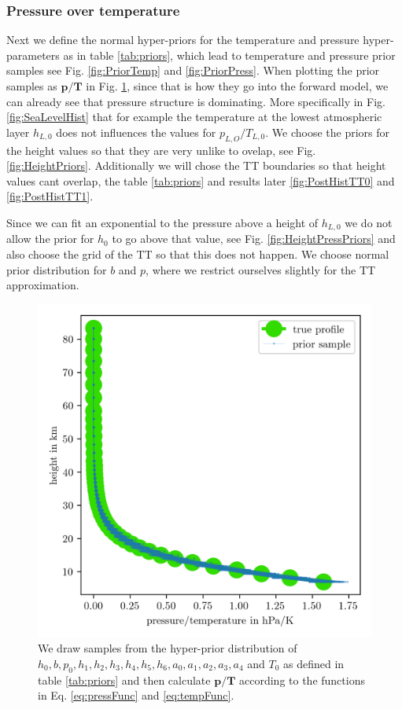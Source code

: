 \subsubsection{Pressure over temperature}
Next we define the normal hyper-priors for the temperature and pressure hyper-parameters as in table \ref{tab:priors}, which lead to temperature and pressure prior samples see Fig. \ref{fig:PriorTemp} and \ref{fig:PriorPress}.
When plotting the prior samples as $\bm{p} / \bm{T}$ in Fig. \ref{fig:PriorPressOverTemp}, since that is how they go into the forward model, we can already see that pressure structure is dominating.
More specifically in Fig. \ref{fig:SeaLevelHist} that for example the temperature at the lowest atmospheric layer $h_{L,0}$ does not influences the values for $p_{L,O}/T_{L,0}$.
We choose the priors for the height values so that they are very unlike to ovelap, see Fig. \ref{fig:HeightPriors}.
Additionally we will chose the TT boundaries so that height values cant overlap, the table \ref{tab:priors} and results later \ref{fig:PostHistTT0} and \ref{fig:PostHistTT1}.

Since we can fit an exponential to the pressure above a height of $h_{L,0}$ we do not allow the prior for $h_0$ to go above that value, see Fig. \ref{fig:HeightPressPriors} and also choose the grid of the TT so that this does not happen.
We choose normal prior distribution for $b$ and $p$, where we restrict ourselves slightly for the TT approximation.


\begin{figure}[ht!]
	\centering
	\includegraphics{PriorTempOverPostMeanSigm.png}
	\caption[Prior Samples of $\bm{p}/\bm{T}$ according to the respective hyper-prior distribution.]{We draw samples from the hyper-prior distribution of $h_0, b, p_0, h_1, h_2,h_3,h_4,h_5,h_6, a_0, a_1, a_2,a_3,a_4$ and $T_0$ as defined in table \ref{tab:priors} and then calculate $\bm{p}/\bm{T}$ according to the functions in Eq. \ref{eq:pressFunc} and \ref{eq:tempFunc}.}
	\label{fig:PriorPressOverTemp}
\end{figure}

